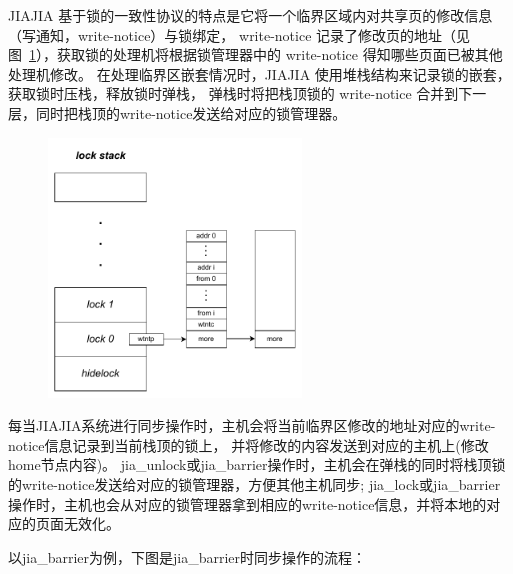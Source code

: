 {    JIAJIA 基于锁的一致性协议的特点是它将一个临界区域内对共享页的修改信息（写通知，write-notice）与锁绑定，
    write-notice 记录了修改页的地址（见图~\ref{fig:JIAJIA-lockstack}），获取锁的处理机将根据锁管理器中的 write-notice 得知哪些页面已被其他处理机修改。
    在处理临界区嵌套情况时，JIAJIA 使用堆栈结构来记录锁的嵌套，获取锁时压栈，释放锁时弹栈，
    弹栈时将把栈顶锁的 write-notice 合并到下一层，同时把栈顶的write-notice发送给对应的锁管理器。

    \begin{figure}[!htbp]
        \centering
        \includegraphics[width=0.6\textwidth]{Img/JIAJIA锁栈结构.drawio.pdf}
        \label{fig:JIAJIA-lockstack}
    \end{figure}

    每当JIAJIA系统进行同步操作时，主机会将当前临界区修改的地址对应的write-notice信息记录到当前栈顶的锁上，
    并将修改的内容发送到对应的主机上(修改home节点内容)。
    jia\_unlock或jia\_barrier操作时，主机会在弹栈的同时将栈顶锁的write-notice发送给对应的锁管理器，方便其他主机同步;
    jia\_lock或jia\_barrier操作时，主机也会从对应的锁管理器拿到相应的write-notice信息，并将本地的对应的页面无效化。

    以jia\_barrier为例，下图是jia\_barrier时同步操作的流程：



}
